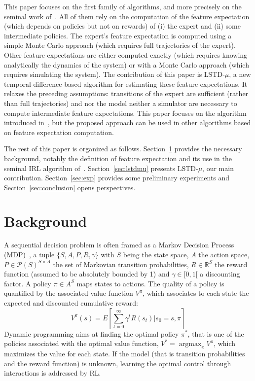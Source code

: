 \documentclass{llncs}
\newcommand{\argmax}{\operatorname*{argmax}} %
\begin{document}
This paper focuses on the first family of algorithms, and more
precisely on the seminal work of~\citet{abbeel2004apprenticeship}. All of them
rely on the computation of the feature expectation (which depends on
policies but not on rewards) of (i) the expert and (ii) some
intermediate policies. The expert's feature expectation is computed
using a simple Monte Carlo approach (which requires full
trajectories of the expert). Other feature expectations are either
computed exactly (which requires knowing analytically the dynamics
of the system) or with a Monte Carlo approach (which requires simulating the system). The contribution of this paper is LSTD-$\mu$,
a new temporal-difference-based algorithm for estimating these feature
expectations. It relaxes the preceding assumptions: transitions
of the expert are sufficient (rather than full trajectories) and nor
the model neither a simulator are necessary to compute intermediate
feature expectations. This paper focuses on the algorithm introduced
in~\citep{abbeel2004apprenticeship}, but the proposed
approach can be used in other algorithms based on feature
expectation computation.

The rest of this paper is organized as follows.
Section~\ref{sec:back} provides the necessary background,
notably the definition of feature expectation and its use in the
seminal IRL algorithm of~\citet{abbeel2004apprenticeship}.
Section~\ref{sec:lstdmu} presents LSTD-$\mu$, our main contribution.
Section~\ref{sec:exp} provides some preliminary experiments and
Section~\ref{sec:conclusion} opens perspectives.


\section{Background}
\label{sec:back}
A sequential decision problem is often framed as a Markov Decision
Process (MDP)~\citep{puterman1994markov}, a tuple
$\{S,A,P,R,\gamma\}$ with $S$ being the state space, $A$ the action
space, $P\in\mathcal{P}(S)^{S\times A}$ the set of Markovian
transition probabilities, $R\in\mathbb{R}^S$ the reward function
(assumed to be absolutely bounded by 1) and $\gamma\in[0,1[$ a
discounting factor. A policy $\pi\in A^S$ maps states to actions. The
quality of a policy is quantified by the associated value function
$V^\pi$, which associates to each state the expected and discounted
cumulative reward:
\begin{equation}
  V^\pi(s) = E[\sum_{t=0}^\infty \gamma^t R(s_t)|s_0=s, \pi]
\end{equation}
Dynamic programming aims at finding the optimal policy $\pi^*$, that
is one of the policies associated with the optimal value function,
$V^* = \argmax_\pi V^\pi$, which maximizes the value for each state.
If the model (that is transition probabilities and the reward
function) is unknown, learning the optimal control through
interactions is addressed by RL.
\end{document}
